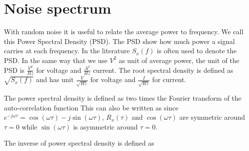 \section{Noise spectrum}
With random noise it is useful to relate the average power to
frequency. We call this Power Spectral Density (PSD). The PSD show how
much power a signal carries at each frequency. In the literature $S_x(f)$
is often used to denote the PSD. In the same way
that we use $V^2$ as unit of average power, the unit of the PSD is
$\frac{V^2}{Hz}$ for voltage and $\frac{A^2}{Hz}$ current. The root
spectral density is defined as $\sqrt{S_x(f)}$ and has unit
$\frac{V}{\sqrt{Hz}}$ for voltage and $\frac{I}{\sqrt{Hz}}$ for
current. 


The power spectral density is defined as two times the Fourier transform of the
auto-correlation function \cite{ziel}
This can also be written as 
since $e^{-j\omega \tau} = \cos(\omega \tau) - j \sin (\omega
  \tau)$,  $R_x(\tau)$ and $\cos(\omega \tau)$ are symmetric around
  $\tau=0$ while $\sin(\omega \tau)$ is asymmetric around $\tau = 0$.

The inverse of power spectral density is defined as

